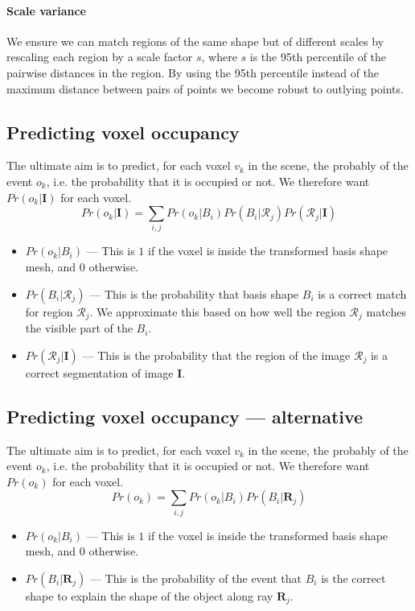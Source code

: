 \documentclass[10pt,a4paper, twocolumn]{article}
\makeatletter
\newcommand*{\ie}{i.e.\@\xspace}
\newcommand{\prob}{Pr}
\newcommand{\rgbdimage}{\mathbf{I}}
\newcommand{\imregion}{\mathcal{R}}
\newcommand{\occ}{o}
\newcommand{\basisshape}{B}
\newcommand{\ray}{\mathbf{R}}
\makeatother
\begin{document}
\paragraph{Scale variance}
We ensure we can match regions of the same shape but of different scales by rescaling each region by a scale factor $s$, where $s$ is the 95th percentile of the pairwise distances in the region. 
By using the 95th percentile instead of the maximum distance between pairs of points we become robust to outlying points.

\subsection{Predicting voxel occupancy}
The ultimate aim is to predict, for each voxel $v_k$ in the scene, the probably of the event $\occ_k$, \ie the probability that it is occupied or not. 
We therefore want $\prob(\occ_k | \rgbdimage)$ for each voxel.
$$
\prob(\occ_k | \rgbdimage) = \sum_{i,j} \prob(\occ_k|\basisshape_i)\prob(\basisshape_i|\imregion_j)\prob(\imregion_j|\rgbdimage)
$$

\begin{itemize}
\item $\prob(\occ_k|\basisshape_i)$ ---
This is $1$ if the voxel is inside the transformed basis shape mesh, and $0$ otherwise.
\item $\prob(\basisshape_i|\imregion_j)$ ---
This is the probability that basis shape $\basisshape_i$ is a correct match for region $\imregion_j$. 
We approximate this based on how well the region $\imregion_j$ matches the visible part of the $\basisshape_i$.
\item $\prob(\imregion_j|\rgbdimage)$ ---
This is the probability that the region of the image $\imregion_j$ is a correct segmentation of image $\rgbdimage$.
\end{itemize}

\subsection{Predicting voxel occupancy --- alternative}
The ultimate aim is to predict, for each voxel $v_k$ in the scene, the probably of the event $\occ_k$, \ie the probability that it is occupied or not. 
We therefore want $\prob(\occ_k)$ for each voxel.
$$
\prob(\occ_k ) = \sum_{i,j} \prob(\occ_k|\basisshape_i)\prob(\basisshape_i|\ray_j)
$$

\begin{itemize}
\item $\prob(\occ_k|\basisshape_i)$ ---
This is $1$ if the voxel is inside the transformed basis shape mesh, and $0$ otherwise.
\item $\prob(\basisshape_i|\ray_j)$ ---
This is the probability of the event that $\basisshape_i$ is the correct shape to explain the shape of the object along ray $\ray_j$.
\end{itemize}
\end{document}

